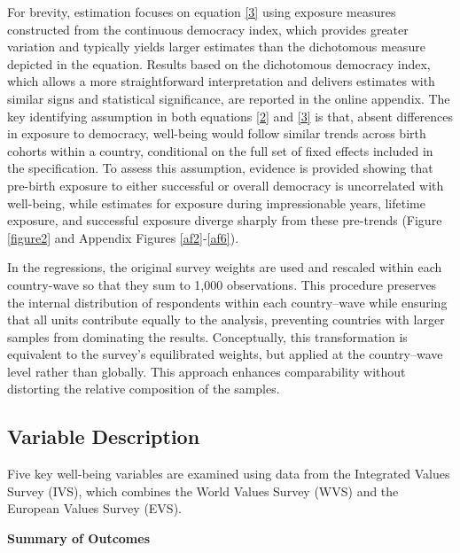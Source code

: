 \documentclass[11pt]{article}
\begin{document}
For brevity, estimation focuses on equation \eqref{3} using exposure measures constructed from the continuous democracy index, which provides greater variation and typically yields larger estimates than the dichotomous measure depicted in the equation. Results based on the dichotomous democracy index, which allows a more straightforward interpretation and delivers estimates with similar signs and statistical significance, are reported in the online appendix. The key identifying assumption in both equations \eqref{2} and \eqref{3} is that, absent differences in exposure to democracy, well-being would follow similar trends across birth cohorts within a country, conditional on the full set of fixed effects included in the specification. To assess this assumption, evidence is provided showing that pre-birth exposure to either successful or overall democracy is uncorrelated with well-being, while estimates for exposure during impressionable years, lifetime exposure, and successful exposure diverge sharply from these pre-trends (Figure \ref{figure2} and Appendix Figures \ref{af2}-\ref{af6}).

In the regressions, the original survey weights are used and rescaled within each country-wave so that they sum to 1,000 observations. This procedure preserves the internal distribution of respondents within each country–wave while ensuring that all units contribute equally to the analysis, preventing countries with larger samples from dominating the results. Conceptually, this transformation is equivalent to the survey’s equilibrated weights, but applied at the country–wave level rather than globally. This approach enhances comparability without distorting the relative composition of the samples.

\vspace*{0.5cm}
\subsection{Variable Description}

Five key well-being variables are examined using data from the Integrated Values Survey (IVS), which combines the World Values Survey (WVS) and the European Values Survey (EVS).

\vspace*{0.5cm}
\begin{center}
	\large \textbf{Summary of Outcomes}
\end{center}
\end{document}
